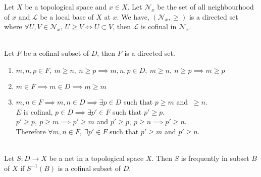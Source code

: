 \begin{remark}
	Let $X$ be a topological space and $x \in X$.
	Let $\mathcal{N}_x$ be the set of all neighbourhood of $x$ and $\mathcal{L}$ be a local base of $X$ at $x$.
	We have, $(\mathcal{N}_x,\ge)$ is a directed set where $\forall U,V \in \mathcal{N}_x,\ U \ge V \iff U \subset V$, then $\mathcal{L}$ is cofinal in $\mathcal{N}_x$.
\end{remark}

\begin{remark}\cite[10.1.8]{joshi}\\
	Let $F$ be a cofinal subset of $D$, then $F$ is a directed set.
	\begin{enumerate}
		\item $m,n,p \in F,\ m \ge n,\ n \ge p \implies m,n,p \in D,\ m \ge n,\ n \ge p \implies m \ge p$
		\item $m \in F \implies m \in D \implies m \ge m$
		\item $m,n \in F \implies m,n \in D \implies \exists p \in D$ such that $p \ge m$ and $\ \ge n$.\\

			$E$ is cofinal, $p \in D \implies \exists p' \in F$ such that $p' \ge p$.\\

			$p' \ge p,\ p \ge m \implies p' \ge m$ and $p' \ge p,\ p \ge n \implies p' \ge n$.\\

			Therefore $\forall m,n \in F,\ \exists p' \in F$ such that $p' \ge m$ and $p' \ge n$.
	\end{enumerate}
\end{remark}

\begin{definition}\cite[10.1.7]{joshi}\\
	Let $S : D \to X$ be a net in a topological space $X$.
	Then $S$ is frequently in subset $B$ of $X$ if $S^{-1}(B)$ is a cofinal subset of $D$.
\end{definition}

